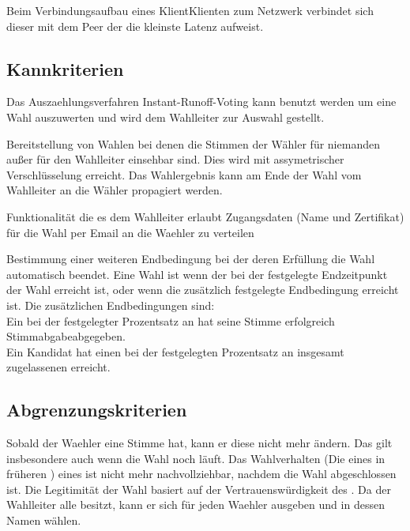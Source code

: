 \documentclass[parskip=full,11pt,twoside]{scrartcl}
\begin{document}
Beim Verbindungsaufbau eines \gls{Klient}{Klienten} zum \gls{Netzwerk} verbindet sich dieser mit dem \gls{Peer} der die kleinste \gls{Latenz} aufweist.

\subsection{Kannkriterien}

Das \gls{Auszaehlungsverfahren} \gls{Instant-Runoff-Voting} kann benutzt werden um eine Wahl auszuwerten und wird dem \gls{Wahlleiter} zur Auswahl gestellt.

Bereitstellung von Wahlen bei denen die Stimmen der Wähler für niemanden außer für den Wahlleiter einsehbar sind.
Dies wird mit assymetrischer Verschlüsselung erreicht.
Das Wahlergebnis kann am Ende der Wahl vom Wahlleiter an die Wähler propagiert werden.

Funktionalität die es dem \gls{Wahlleiter} erlaubt Zugangsdaten (Name und \gls{Zertifikat}) für die \gls{Wahl} per Email an die \gls{Waehler} zu verteilen

Bestimmung einer weiteren Endbedingung bei der  deren Erfüllung die \gls{Wahl} automatisch beendet.
Eine Wahl ist  wenn der bei der  festgelegte Endzeitpunkt der Wahl erreicht ist, oder wenn die zusätzlich festgelegte Endbedingung erreicht ist.
Die zusätzlichen Endbedingungen sind:\\
Ein bei der  festgelegter Prozentsatz an  hat seine Stimme erfolgreich \gls{Stimmabgabe}{abgegeben}.\\
Ein \gls{Kandidat} hat einen bei der  festgelegten Prozentsatz an insgesamt zugelassenen  erreicht.

\subsection{Abgrenzungskriterien}
Sobald der \gls{Waehler} eine Stimme  hat, kann er diese nicht mehr ändern. Das gilt insbesondere auch wenn die \gls{Wahl} noch läuft.
Das Wahlverhalten (Die  eines  in früheren ) eines  ist nicht mehr nachvollziehbar, nachdem die \gls{Wahl} abgeschlossen ist.
Die Legitimität der \gls{Wahl} basiert auf der Vertrauenswürdigkeit des . Da der \gls{Wahlleiter} alle  besitzt, kann er sich für jeden \gls{Waehler} ausgeben und in dessen Namen wählen.
\end{document}

